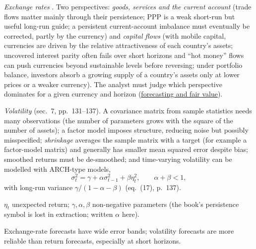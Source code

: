 \begin{qfmethod}\label{meth:fx-volatility-forecasts}
 \emph{Exchange rates} \citep[chap.~4, sec.~6, pp.~124--131]{portfolio-management-in-practice-v1-2020}. Two perspectives: \emph{goods, services and the current account} (trade flows matter mainly through their persistence; PPP is a weak short-run but useful long-run guide; a persistent current-account imbalance must eventually be corrected, partly by the currency) and \emph{capital flows} (with mobile capital, currencies are driven by the relative attractiveness of each country's assets; uncovered interest parity often fails over short horizons and ``hot money'' flows can push currencies beyond sustainable levels before reversing; under portfolio balance, investors absorb a growing supply of a country's assets only at lower prices or a weaker currency). The analyst must judge which perspective dominates for a given currency and horizon (\hyperref[meth:exchange-rate-forecasting-fair-value]{forecasting and fair value}).

\emph{Volatility} (sec.~7, pp.~131--137). A covariance matrix from sample statistics needs many observations (the number of parameters grows with the square of the number of assets); a factor model imposes structure, reducing noise but possibly misspecified; \emph{shrinkage} averages the sample matrix with a target (for example a factor-model matrix) and generally has smaller mean squared error despite bias; smoothed returns must be de-smoothed; and time-varying volatility can be modelled with ARCH-type models,
\[
\sigma_t^2=\gamma+\alpha\sigma_{t-1}^2+\beta\eta_t^2,\qquad \alpha+\beta<1,
\]
with long-run variance $\gamma/(1-\alpha-\beta)$ (eq.~(17), p.~137).

 $\eta_t$ unexpected return; $\gamma,\alpha,\beta$ non-negative parameters (the book's persistence symbol is lost in extraction; written $\alpha$ here).

 Exchange-rate forecasts have wide error bands; volatility forecasts are more reliable than return forecasts, especially at short horizons.


\end{qfmethod}
